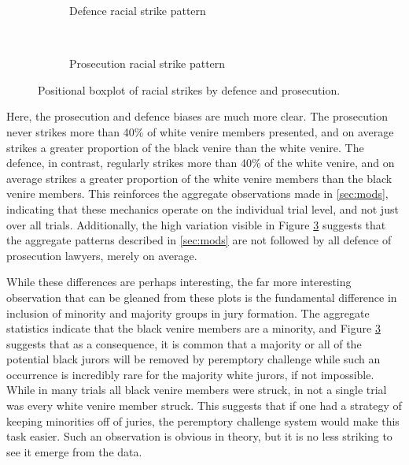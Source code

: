 \begin{figure}[h!]
  \centering
  \begin{subfigure}{0.7\textwidth}
    \caption{\footnotesize Defence racial strike pattern}
    \label{fig:defraceprop}
  \end{subfigure}
  ~
  \begin{subfigure}{0.7\textwidth}
    \caption{\footnotesize Prosecution racial strike pattern}
    \label{fig:proraceprop}
  \end{subfigure}
  \caption[Racial Strike Proportions by Party]
  {\footnotesize Positional boxplot of racial strikes by defence and prosecution.}
  \label{fig:defproprop}
\end{figure}

Here, the prosecution and defence biases are much more clear. The prosecution never strikes more than 40\% of white venire members
presented, and on average strikes a greater proportion of the black venire than the white venire. The defence, in contrast,
regularly strikes more than 40\% of the white venire, and on average strikes a greater proportion of the white venire members than
the black venire members. This reinforces the aggregate observations made in \ref{sec:mods}, indicating that these mechanics
operate on the individual trial level, and not just over all trials. Additionally, the high variation visible in Figure
\ref{fig:defproprop} suggests that the aggregate patterns described in \ref{sec:mods} are not followed by all defence of
prosecution lawyers, merely on average.

While these differences are perhaps interesting, the far more interesting observation that can be gleaned from these plots is the
fundamental difference in inclusion of minority and majority groups in jury formation. The aggregate statistics indicate that the
black venire members are a minority, and Figure \ref{fig:defproprop} suggests that as a consequence, it is common that a majority
or all of the potential black jurors will be removed by peremptory challenge while such an occurrence is incredibly rare for the
majority white jurors, if not impossible. While in many trials all black venire members were struck, in not a single trial was
every white venire member struck. This suggests that if one had a strategy of keeping minorities off of juries, the peremptory
challenge system would make this task easier. Such an observation is obvious in theory, but it is no less striking to see it
emerge from the data.

